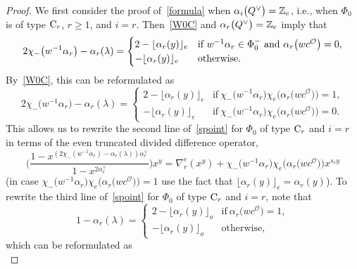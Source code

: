 \documentclass[11pt]{article}
\numberwithin{equation}{section}
\numberwithin{equation}{section}
\begin{document}
\begin{proof}
We first consider the proof of~\eqref{formula} when $\alpha_i\smash{\bigl(Q^\vee\bigr)}=\mathbb{Z}_e$, i.e., when $\Phi_0$ is of type ${\rm C}_r$, $r\geq 1$, and $i=r$.
Then~\eqref{W0C} and $\alpha_r\smash{\bigl(Q^\vee\bigr)}=\mathbb{Z}_e$ imply that
\begin{equation*}
2\chi_-\bigl(w^{-1}\alpha_r\bigr)-\alpha_r(\lambda)=
\begin{cases}
2-\lfloor\alpha_r(y)\rfloor_e &\hbox{if }  w^{-1}\alpha_r\in\Phi_0^-\ \text{and}\ \alpha_r\bigl(wc^\mathcal{O}\bigr)=0,\\
-\lfloor\alpha_r(y)\rfloor_e &\textup{otherwise}.
\end{cases}
\end{equation*}
By~\eqref{W0C},
this can be reformulated as
\begin{equation*}%
2\chi_-\bigl(w^{-1}\alpha_r\bigr)-\alpha_r(\lambda)=
\begin{cases}
2-\lfloor\alpha_r(y)\rfloor_e &\text{if}\ \chi_-\bigl(w^{-1}\alpha_r\bigr)\chi_e\bigl(\alpha_r\bigl(wc^\mathcal{O}\bigr)\bigr)=1,\\
-\lfloor\alpha_r(y)\rfloor_e &\text{if}\ \chi_-\bigl(w^{-1}\alpha_r\bigr)\chi_e\bigl(\alpha_r\bigl(wc^\mathcal{O}\bigr)\bigr)=0.
\end{cases}
\end{equation*}
This allows us to rewrite the second line of~\eqref{spoint} for $\Phi_0$ of type ${\rm C}_r$ and $i=r$ in terms of the even truncated divided difference operator,
\begin{equation}\label{claim1}
\Biggl(\frac{1-x^{(2\chi_-(w^{-1}\alpha_r)-\alpha_r(\lambda))\alpha_r^\vee}}{1-x^{2\alpha_r^\vee}}\Biggr)x^{y}=
\nabla_r^e(x^y)+
\chi_-\bigl(w^{-1}\alpha_r\bigr)\chi_e\bigl(\alpha_r\bigl(wc^\mathcal{O}\bigr)\bigr)x^{s_ry}
\end{equation}
\big(in case $\chi_-\bigl(w^{-1}\alpha_r\bigr)\chi_e\bigl(\alpha_r\bigl(wc^\mathcal{O}\bigr)\bigr)=1$ use the fact that $\lfloor\alpha_r(y)\rfloor_e=\alpha_r(y)$\big).
To rewrite the third line of~\eqref{spoint} for $\Phi_0$ of type ${\rm C}_r$ and $i=r$, note that
\begin{equation*}
1-\alpha_r(\lambda)=
\begin{cases}
2-\lfloor\alpha_r(y)\rfloor_o &\text{if}\ \alpha_r\bigl(wc^\mathcal{O}\bigr)=1,\\
-\lfloor\alpha_r(y)\rfloor_o &\text{otherwise},
\end{cases}
\end{equation*}
which can be reformulated as
\begin{equation*}%

\end{equation*}
\end{proof}
\end{document}
